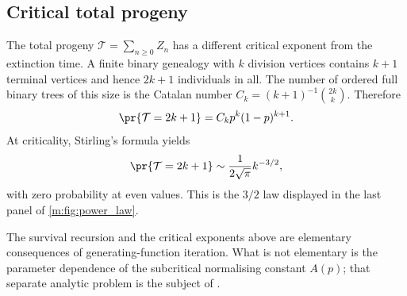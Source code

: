 \FloatBarrier

\subsection{Critical total progeny}\label{m:sec:total-progeny}

The total progeny \(\mathcal T=\sum_{n\geq0}Z_n\) has a different critical
exponent from the extinction time.  A finite binary genealogy with \(k\) division
vertices contains \(k+1\) terminal vertices and hence \(2k+1\) individuals in all.
The number of ordered full binary trees of this size is the Catalan number
\(C_k=(k+1)^{-1}\binom{2k}{k}\).  Therefore
\begin{equation}
  \pr{\mathcal T=2k+1}=C_kp^k(1-p)^{k+1}.
  \label{m:eq:total-progeny-exact}
\end{equation}
At criticality, Stirling's formula yields
\begin{equation}
  \pr{\mathcal T=2k+1}\sim\frac{1}{2\sqrt{\pi}}k^{-3/2},
  \label{m:eq:total-progeny-asymptotic}
\end{equation}
with zero probability at even values.  This is the \(3/2\) law displayed in the
last panel of \cref{m:fig:power_law}.

The survival recursion and the critical exponents above are elementary
consequences of generating-function iteration.  What is not elementary is the
parameter dependence of the subcritical normalising constant \(A(p)\); that
separate analytic problem is the subject of \ChA.
